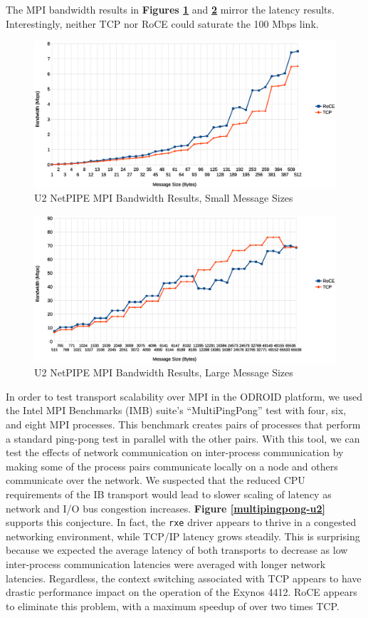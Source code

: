 \documentclass[11pt]{book}
\begin{document}
The MPI bandwidth results in \textbf{Figures \ref{npmpi-lbw}} and
\textbf{\ref{npmpi-hbw}} mirror the latency results. Interestingly, neither TCP
nor RoCE could saturate the 100 Mbps link.

\begin{figure}[h]
\includegraphics[width=\textwidth]{netpipe_bw_small}
\caption{U2 NetPIPE MPI Bandwidth Results, Small Message Sizes}
\label{npmpi-lbw}
\end{figure}



\begin{figure}[h]
\includegraphics[width=\textwidth]{netpipe_bw_large}
\caption{U2 NetPIPE MPI Bandwidth Results, Large Message Sizes}
\label{npmpi-hbw}
\end{figure}

In order to test transport scalability over MPI in the ODROID platform, we used
the Intel MPI Benchmarks (IMB) suite's ``MultiPingPong'' test with four, six,
and eight MPI processes. This benchmark creates pairs of processes that perform
a standard ping-pong test in parallel with the other pairs. With this tool, we
can test the effects of network communication on inter-process communication by
making some of the process pairs communicate locally on a node and others
communicate over the network. We suspected that the reduced CPU requirements of
the IB transport would lead to slower scaling of latency as network and I/O bus
congestion increases. \textbf{Figure \ref{multipingpong-u2}} supports this
conjecture. In fact, the \verb;rxe; driver appears to thrive in a congested
networking environment, while TCP/IP latency grows steadily. This is surprising
because we expected the average latency of both transports to decrease as low
inter-process communication latencies were averaged with longer network
latencies. Regardless, the context switching associated with TCP appears to have
drastic performance impact on the operation of the Exynos 4412. RoCE appears to
eliminate this problem, with a maximum speedup of over two times TCP.
\end{document}
